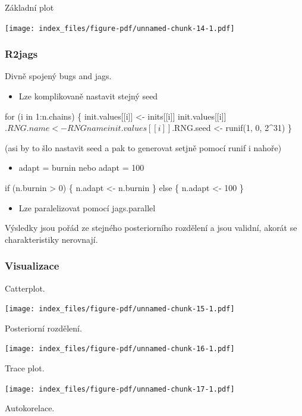\documentclass[
  11pt,
  a4paper]{report}
\providecommand{\tightlist}{%
  \setlength{\itemsep}{0pt}\setlength{\parskip}{0pt}}\usepackage{longtable,booktabs,array}
\begin{document}
Základní plot

\texttt{[image: index\_files/figure-pdf/unnamed-chunk-14-1.pdf]}

\subsubsection{R2jags}\label{r2jags}

Divně spojený bugs and jags.

\begin{itemize}
\tightlist
\item
  Lze komplikovaně nastavit stejný seed
\end{itemize}

for (i in 1:n.chains) \{ init.values{[}{[}i{]}{]} \textless-
inits{[}{[}i{]}{]} init.values{[}{[}i{]}{]}\(.RNG.name <- RNGname
    init.values[[i]]\).RNG.seed \textless- runif(1, 0, 2\^{}31) \}

(asi by to šlo nastavit seed a pak to generovat setjně pomocí runif i
nahoře)

\begin{itemize}
\tightlist
\item
  adapt = burnin nebo adapt = 100
\end{itemize}

if (n.burnin \textgreater{} 0) \{ n.adapt \textless- n.burnin \} else \{
n.adapt \textless- 100 \}

\begin{itemize}
\tightlist
\item
  Lze paralelizovat pomocí jags.parallel
\end{itemize}

Výsledky jsou pořád ze stejného posteriorního rozdělení a jsou validní,
akorát se charakteristiky nerovnají.

\subsubsection{Visualizace}\label{visualizace}

Catterplot.

\texttt{[image: index\_files/figure-pdf/unnamed-chunk-15-1.pdf]}

Posteriorní rozdělení.

\texttt{[image: index\_files/figure-pdf/unnamed-chunk-16-1.pdf]}

Trace plot.

\texttt{[image: index\_files/figure-pdf/unnamed-chunk-17-1.pdf]}

Autokorelace.
\end{document}
